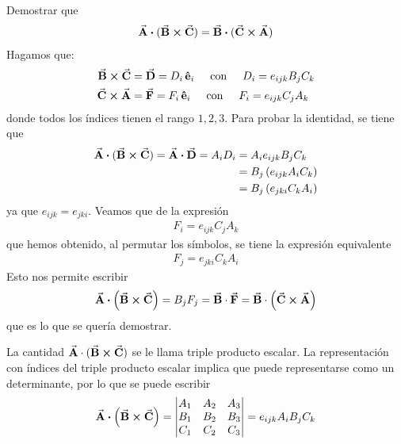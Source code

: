 \documentclass[hidelinks,12pt]{article}
\begin{document}
Demostrar que
\begin{align*}
    \va{A} \vdot (\va{B} \cross \va{C}) = \va{B} \vdot (\va{C} \cross \va{A})
\end{align*}
Hagamos que:
\begin{align*}
    \va{B} \cross \va{C} &= \va{D} = D_{i} \, \vu{e}_{i} \hspace{0.5cm} \text{con} \hspace{0.5cm} D_{i} = e_{ijk} B_{j} C_{k} \\
    \va{C} \cross \va{A} &= \va{F} = F_{i} \, \vu{e}_{i} \hspace{0.5cm} \text{con} \hspace{0.5cm} F_{i} = e_{ijk} C_{j} A_{k}
\end{align*}
donde todos los índices tienen el rango $1, 2, 3$. Para probar la identidad, se tiene que
\begin{align*}
    \va{A} \vdot (\va{B} \cross \va{C}) = \va{A} \vdot \va{D} = A_{i} D_{i} &= A_{i} e_{ijk} B_{j} C_{k} \\
        &= B_{j} \left( e_{ijk} A_{i} C_{k} \right) \\
        &= B_{j} \left( e_{jki} C_{k} A_{i} \right) \\
\end{align*}
ya que $e_{ijk} = e_{jki}$. Veamos que de la expresión
\begin{align*}
    F_{i} = e_{ijk} C_{j} A_{k}
\end{align*}
que hemos obtenido, al permutar los símbolos, se tiene la expresión equivalente
\begin{align*}
    F_{j} = e_{jki} C_{k} A_{i}
\end{align*}
Esto nos permite escribir
\begin{align*}
    \va{A} \vdot \left( \va{B} \cross \va{C} \right) = B_{j} F_{j} = \va{B} \cdot \va{F} = \va{B} \cdot \left( \va{C} \cross \va{A} \right)
\end{align*}
que es lo que se quería demostrar.
\par
La cantidad $\va{A} \cdot (\va{B} \cross \va{C})$ se le llama triple producto escalar. La representación con índices del triple producto escalar implica que puede representarse como un determinante, por lo que se puede escribir
\begin{align*}
    \va{A} \vdot \left( \va{B} \cross \va{C} \right) = \mqty|
        A_{1} & A_{2} & A_{3} \\
        B_{1} & B_{2} & B_{3} \\
        C_{1} & C_{2} & C_{3}
    | = e_{ijk} A_{i} B_{j} C_{k}
\end{align*}
\end{document}
